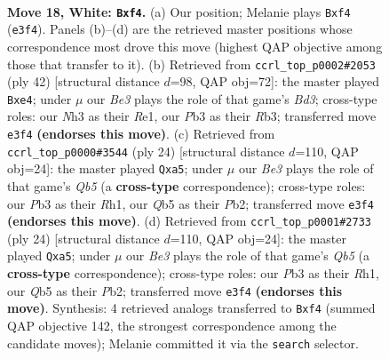 \documentclass[11pt]{article}
\begin{document}
\clearpage

\begin{figure}[p]\centering
\begin{subfigure}{0.46\textwidth}\centering
\resizebox{\linewidth}{!}{%
\newchessgame
\chessboard[
  setfen={rn1q1br1/4kp2/3p1np1/1QpP4/4Pp2/1PN1B2N/P2K4/R6R w - - 2 18},
  showmover=false,
  pgfstyle=straightmove, color=movearrow, markmove={e3-f4}
]}
\caption{}
\end{subfigure}\hfill
\begin{subfigure}{0.46\textwidth}\centering
\resizebox{\linewidth}{!}{%
\newchessgame
\chessboard[
  setfen={r1b2rk1/5ppp/2pq4/1p6/1PnPp2P/1R1B1N2/5PP1/2Q1R1K1 w - - 0 22},
  showmover=false,
  pgfstyle=straightmove, color=movearrow, markmove={d3-e4}
]}
\caption{}
\end{subfigure}
\\[4pt]
\begin{subfigure}{0.46\textwidth}\centering
\resizebox{\linewidth}{!}{%
\newchessgame
\chessboard[
  setfen={rn1q1rk1/5ppp/b3pn2/pQ6/2pP4/5NP1/1P2PPBP/RN2K2R w KQ - 1 13},
  showmover=false,
  pgfstyle=straightmove, color=movearrow, markmove={b5-a5}
]}
\caption{}
\end{subfigure}\hfill
\begin{subfigure}{0.46\textwidth}\centering
\resizebox{\linewidth}{!}{%
\newchessgame
\chessboard[
  setfen={rn1q1rk1/5ppp/b3pn2/pQ6/2pP4/5NP1/1P2PPBP/RN2K2R w KQ - 1 13},
  showmover=false,
  pgfstyle=straightmove, color=movearrow, markmove={b5-a5}
]}
\caption{}
\end{subfigure}
\caption{\textbf{Move 18, White: \texttt{Bxf4}.} (a) Our position; Melanie plays \texttt{Bxf4} (\texttt{e3f4}). Panels (b)--(d) are the retrieved master positions whose correspondence most drove this move (highest QAP objective among those that transfer to it). (b) Retrieved from \texttt{ccrl\_top\_p0002\#2053} (ply 42) [structural distance $d$=98, QAP obj=72]: the master played \texttt{Bxe4}; under $\mu$ our \emph{Be3} plays the role of that game's \emph{Bd3}; cross-type roles: our \emph{N}h3 as their \emph{R}e1, our \emph{P}b3 as their \emph{R}b3; transferred move \texttt{e3f4} \textbf{(endorses this move)}. (c) Retrieved from \texttt{ccrl\_top\_p0000\#3544} (ply 24) [structural distance $d$=110, QAP obj=24]: the master played \texttt{Qxa5}; under $\mu$ our \emph{Be3} plays the role of that game's \emph{Qb5} (a \textbf{cross-type} correspondence); cross-type roles: our \emph{P}b3 as their \emph{R}h1, our \emph{Q}b5 as their \emph{P}b2; transferred move \texttt{e3f4} \textbf{(endorses this move)}. (d) Retrieved from \texttt{ccrl\_top\_p0001\#2733} (ply 24) [structural distance $d$=110, QAP obj=24]: the master played \texttt{Qxa5}; under $\mu$ our \emph{Be3} plays the role of that game's \emph{Qb5} (a \textbf{cross-type} correspondence); cross-type roles: our \emph{P}b3 as their \emph{R}h1, our \emph{Q}b5 as their \emph{P}b2; transferred move \texttt{e3f4} \textbf{(endorses this move)}. Synthesis: 4 retrieved analogs transferred to \texttt{Bxf4} (summed QAP objective 142, the strongest correspondence among the candidate moves); Melanie committed it via the \texttt{search} selector.}
\label{fig:thought-m34}
\end{figure}
\end{document}
